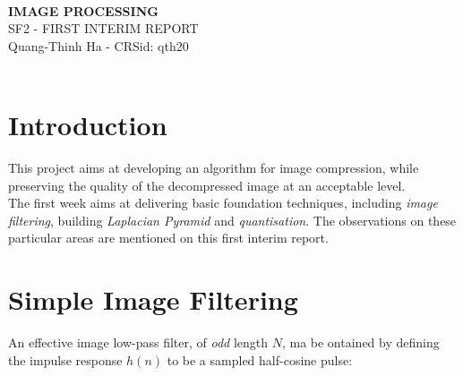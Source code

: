 \documentclass[a4paper, 11pt]{article}
\begin{document}
\Large
\begin{center}
\hrulefill \\
\textbf{IMAGE PROCESSING} \\
SF2 - FIRST INTERIM REPORT \\
\vspace{0.2cm}
\normalsize 
Quang-Thinh Ha - CRSid: qth20 \\
\hrulefill \\
\end{center}

\normalsize

\section{Introduction}

This project aims at developing an algorithm for image compression, while preserving the quality of the decompressed image at an acceptable level. \\
\noindent
The first week aims at delivering basic foundation techniques, including \textit{image filtering}, building \textit{Laplacian Pyramid} and \textit{quantisation}. The observations on these particular areas are mentioned on this first interim report. 

\section{Simple Image Filtering}
An effective image low-pass filter, of \textit{odd} length $\mathit{N}$, ma be ontained by defining the impulse response $\mathit{h(n)}$ to be a sampled half-cosine pulse:
\end{document}
